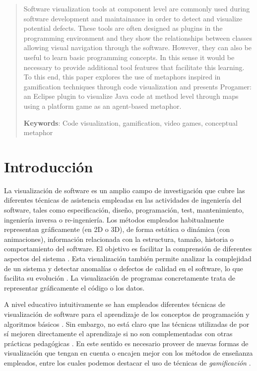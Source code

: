 \documentclass{llncs}
\begin{document}
\begin{abstract} 
Software visualization tools at component level are commonly used during software development and maintainance in order to detect and visualize potential defects. These tools are often designed as plugins in the programming environment and they show the relationships between classes allowing visual navigation through the software. However, they can also be useful to  learn  basic programming concepts. In this sense it would be necessary to provide additional tool features that facilitate this learning. To this end, this paper explores the use of metaphors inspired in gamification techniques through code visualization and presents Progamer: an Eclipse plugin to visualize Java code at method level through maps using a platform game as an agent-based metaphor.

\textbf{Keywords}: Code visualization, gamification, video games, conceptual metaphor
\end{abstract}


%
%
\section{Introducción}
\label{sec:intro}
La visualización de software es un amplio campo de investigación que cubre las diferentes técnicas de asistencia empleadas en las actividades de ingeniería del software, tales como especificación, diseño, programación, test, mantenimiento, ingeniería inversa o re-ingeniería. Los métodos empleados habitualmente representan gráficamente (en 2D o 3D), de forma estática o dinámica (con animaciones), información relacionada con la estructura, tamaño, historia o comportamiento del software. El objetivo es facilitar la comprensión de diferentes aspectos del sistema \cite{baecker1988enhancing}. Esta visualización también permite analizar la complejidad de un sistema y detectar anomalías o defectos de calidad en el software, lo que facilita su evolución \cite{softwarevisualization}. La visualización de programas concretamente trata de representar gráficamente el código o los datos. 

A nivel educativo intuitivamente se han empleados diferentes técnicas de visualización de software para el aprendizaje de los conceptos de programación y algoritmos básicos \cite{urquiza2009survey}. Sin embargo, no está claro que las técnicas utilizadas de por sí mejoren directamente el aprendizaje si no son complementadas con otras prácticas pedagógicas \cite{naps2002exploring}. En este sentido es necesario proveer de nuevas formas de visualización que tengan en cuenta o encajen mejor con los métodos de enseñanza empleados, entre los cuales podemos destacar el uso de técnicas de \emph{gamificación} \cite{salen2011quest}.
\end{document}
